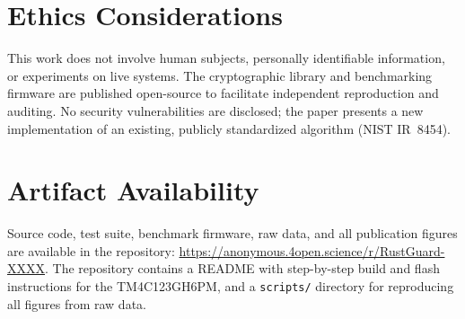 \documentclass[anonymous]{ndss}
\begin{document}
\section*{Ethics Considerations}

This work does not involve human subjects, personally identifiable
information, or experiments on live systems. The cryptographic
library and benchmarking firmware are published open-source to
facilitate independent reproduction and auditing. No security
vulnerabilities are disclosed; the paper presents a new implementation
of an existing, publicly standardized algorithm (NIST IR~8454).

\section*{Artifact Availability}

Source code, test suite, benchmark firmware, raw data, and all
publication figures are available in the repository:
\url{https://anonymous.4open.science/r/RustGuard-XXXX}.
The repository contains a README with step-by-step build and
flash instructions for the TM4C123GH6PM, and a \texttt{scripts/}
directory for reproducing all figures from raw data.
\end{document}
